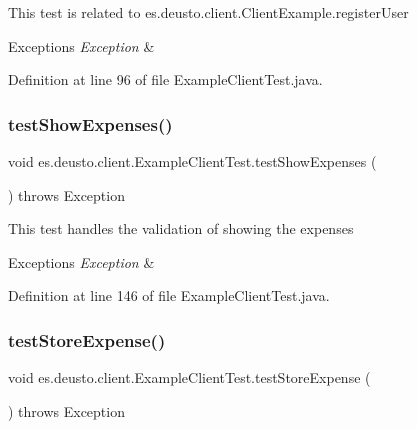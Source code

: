 This test is related to es.\+deusto.\+client.\+Client\+Example.\+register\+User ~\newline

\begin{DoxyExceptions}{Exceptions}
{\em Exception} & \\
\hline
\end{DoxyExceptions}


Definition at line 96 of file Example\+Client\+Test.\+java.

\mbox{\label{classes_1_1deusto_1_1client_1_1_example_client_test_adedccf184289eaf6d6cc3f53a2fdc621}} 
\subsubsection{\texorpdfstring{test\+Show\+Expenses()}{testShowExpenses()}}
{\footnotesize\ttfamily void es.\+deusto.\+client.\+Example\+Client\+Test.\+test\+Show\+Expenses (\begin{DoxyParamCaption}{ }\end{DoxyParamCaption}) throws Exception}

This test handles the validation of showing the expenses 
\begin{DoxyExceptions}{Exceptions}
{\em Exception} & \\
\hline
\end{DoxyExceptions}


Definition at line 146 of file Example\+Client\+Test.\+java.

\mbox{\label{classes_1_1deusto_1_1client_1_1_example_client_test_ad8b31f30dcc49c24a0473d59f0c8d9ef}} 
\subsubsection{\texorpdfstring{test\+Store\+Expense()}{testStoreExpense()}}
{\footnotesize\ttfamily void es.\+deusto.\+client.\+Example\+Client\+Test.\+test\+Store\+Expense (\begin{DoxyParamCaption}{ }\end{DoxyParamCaption}) throws Exception}

